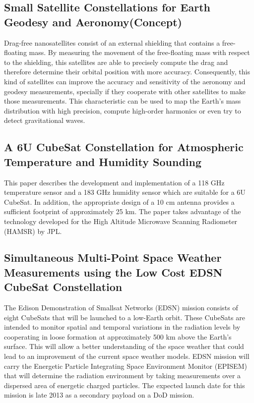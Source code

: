 \subsection{Small Satellite Constellations for Earth Geodesy and Aeronomy(Concept)}
\label{geodesy}

Drag-free nanosatellites consist of an external shielding that contains a free-floating mass. By measuring the movement of the free-floating mass with respect to the shielding, this satellites are able to precisely compute the drag and therefore determine their orbital position with more accuracy. Consequently, this kind of satellites can  improve the accuracy and sensitivity of the aeronomy and geodesy measurements, specially if they cooperate with other satellites to make those measurements. This characteristic can be used to map the Earth's mass distribution
with high precision, compute high-order harmonics or even try to detect gravitational waves.\cite{Conklin_GeoAero_Constellation}

\subsection{A 6U CubeSat Constellation for Atmospheric Temperature and Humidity Sounding}
\label{temp_sounding}

This paper describes the development and implementation of a 118 GHz temperature sensor and a 183 GHz humidity sensor which are suitable for a 6U CubeSat. In addition, the appropriate design of a 10 cm antenna provides a sufficient footprint of approximately 25 km. The paper takes advantage of the technology developed for the High Altitude Microwave Scanning Radiometer (HAMSR) by JPL. \cite{Sharmila_ContellationTempHumidity}

\subsection{Simultaneous Multi-Point Space Weather Measurements using the Low Cost EDSN CubeSat Constellation}
\label{edsn}

The Edison Demonstration of Smallsat Networks (EDSN) mission consists of eight CubeSats that will be launched to a low-Earth orbit. These CubeSats are intended to monitor spatial and temporal variations in the radiation levels by cooperating in loose formation at approximately 500 km above the Earth's surface. This will allow a better understanding of the space weather that could lead to an improvement of the current space weather models. EDSN mission will carry the Energetic Particle Integrating Space Environment Monitor (EPISEM) that will determine the radiation environment by taking measurements over a dispersed area of energetic charged particles. The expected launch date for this mission is late 2013 as a secondary payload on a DoD mission.\cite{Gunderson_MultiptMeasureConstellation}\cite{Yost_MultipointMeasurement}


